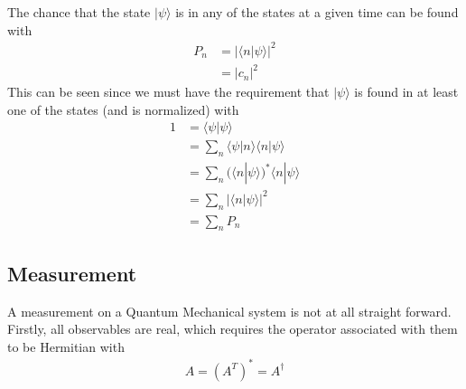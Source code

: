 The chance that the state $|\psi\rangle$ is in any of the states at a given time can be found with
\begin{align}
P_n &= |\langle n|\psi\rangle |^2\\
&= |c_n|^2
\end{align}
This can be seen since we must have the requirement that $|\psi\rangle$ is found in at least one of the states (and is normalized) with
\begin{align}
1 &= \langle \psi |\psi \rangle\\
&= \sum_{n} \langle \psi |n\rangle\langle n|\psi\rangle\\
&= \sum_n (\langle n|\psi\rangle)^*\langle n |\psi \rangle\\
&= \sum_n |\langle n | \psi \rangle |^2\\
&= \sum_n P_n
\end{align}



\subsection{Measurement}
A measurement on a Quantum Mechanical system is not at all straight forward. Firstly, all observables are real, which requires the operator associated with them to be Hermitian with
\begin{align}
A = (A^T)^* = A^\dagger
\end{align}



